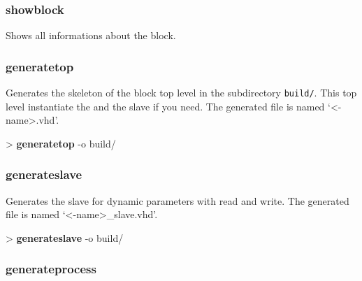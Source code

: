 \documentclass[10pt,a4paper]{article}
\begin{document}
\subsubsection{showblock}

Shows all informations about the block.

\subsubsection{generatetop}

Generates the skeleton of the block top level in the subdirectory \texttt{build/}. This top level instantiate the \kind{} and the slave if you need. The generated file is named `<\kind{}-name>.vhd'.\\


\begin{sampletitle}
> \textbf{\tool{} generatetop} -o build/
\end{sampletitle}

\subsubsection{generateslave}

Generates the slave for dynamic parameters with read and write. The generated file is named `<\kind{}-name>\_slave.vhd'.\\


\begin{sampletitle}
> \textbf{\tool{} generateslave} -o build/
\end{sampletitle}

\subsubsection{generateprocess}
\end{document}
